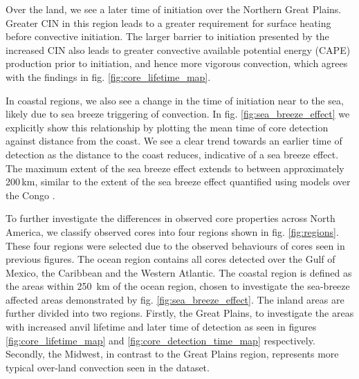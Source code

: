 
Over the land, we see a later time of initiation over the Northern Great Plains.
Greater CIN in this region leads to a greater requirement for surface heating before convective initiation.
The larger barrier to initiation presented by the increased CIN also leads to greater convective available potential energy (CAPE) production prior to initiation, and hence more vigorous convection, which agrees with the findings in fig. \ref{fig:core_lifetime_map}.

In coastal regions, we also see a change in the time of initiation near to the sea, likely due to sea breeze triggering of convection.
In fig. \ref{fig:sea_breeze_effect} we explicitly show this relationship by plotting the mean time of core detection against distance from the coast.
We see a clear trend towards an earlier time of detection as the distance to the coast reduces, indicative of a sea breeze effect.
The maximum extent of the sea breeze effect extends to between approximately 200\,\unit{km}, similar to the extent of the sea breeze effect quantified using models over the Congo \citep{park_environmental_2020}.


To further investigate the differences in observed core properties across North America, we classify observed cores into four regions shown in fig. \ref{fig:regions}.
These four regions were selected due to the observed behaviours of cores seen in previous figures.
The ocean region contains all cores detected over the Gulf of Mexico, the Caribbean and the Western Atlantic.
The coastal region is defined as the areas within 250~km of the ocean region, chosen to investigate the sea-breeze affected areas demonstrated by fig. \ref{fig:sea_breeze_effect}.
The inland areas are further divided into two regions.
Firstly, the Great Plains, to investigate the areas with increased anvil lifetime and later time of detection as seen in figures \ref{fig:core_lifetime_map} and \ref{fig:core_detection_time_map} respectively.
Secondly, the Midwest, in contrast to the Great Plains region, represents more typical over-land convection seen in the dataset.

